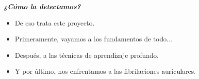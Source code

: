 %        



\begin{frame}
    \begin{center}
        {\vspace{-1cm} \Large \color{TurkishRose}\textbf{\textit{¿Cómo la detectamos?}}} \\
    \end{center}

    \pause
    \begin{center}
    \vspace{1cm}
        \begin{itemize}
            \setlength\itemsep{1em}
            \item De eso trata este proyecto. \\
            \pause
            \item Primeramente, vayamos a los fundamentos de todo... 
            \pause
            \item  Después, a las técnicas de aprendizaje profundo.
            \pause 
            \item Y por último, nos enfrentamos a las fibrilaciones auriculares.
        \end{itemize}
    \end{center}
    
\end{frame}


